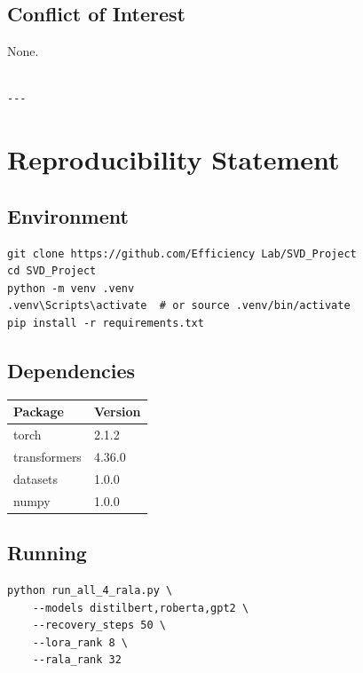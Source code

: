 \subsection{Conflict of Interest}

None.
\begin{lstlisting}

---
\end{lstlisting}


\section{Reproducibility Statement}

\subsection{Environment}

\begin{lstlisting}
git clone https://github.com/Efficiency Lab/SVD_Project
cd SVD_Project
python -m venv .venv
.venv\Scripts\activate  # or source .venv/bin/activate
pip install -r requirements.txt
\end{lstlisting}

\subsection{Dependencies}

\begin{table}[H]
\centering
\small
\begin{tabular}{ll}
\toprule
\textbf{Package} & \textbf{Version} \\
\midrule
torch & 2.1.2 \\
transformers & 4.36.0 \\
datasets & 1.0.0 \\
numpy & 1.0.0 \\
\bottomrule
\end{tabular}
\end{table}

\subsection{Running}

\begin{lstlisting}
python run_all_4_rala.py \
    --models distilbert,roberta,gpt2 \
    --recovery_steps 50 \
    --lora_rank 8 \
    --rala_rank 32
\end{lstlisting}

